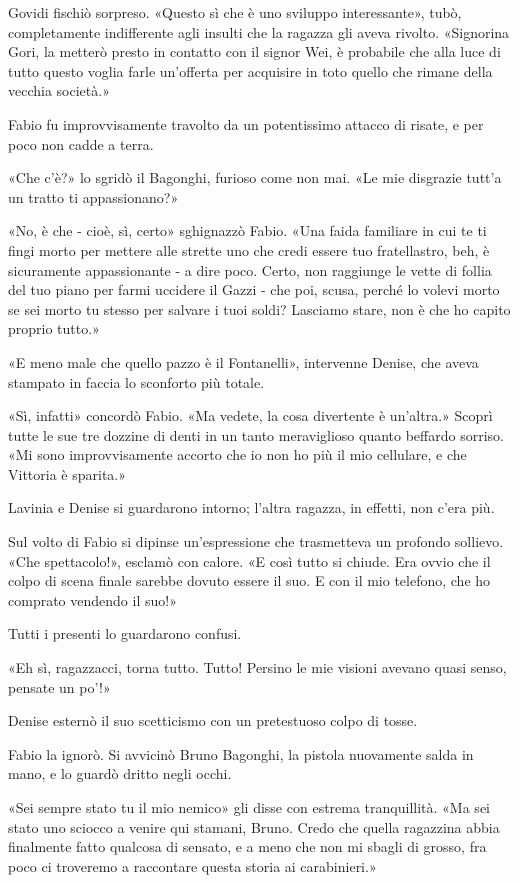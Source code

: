 Govidi fischiò sorpreso. «Questo sì che è uno sviluppo interessante», tubò, completamente indifferente agli insulti che la ragazza gli aveva rivolto. «Signorina Gori, la metterò presto in contatto con il signor Wei, è probabile che alla luce di tutto questo voglia farle un'offerta per acquisire in toto quello che rimane della vecchia società.»

Fabio fu improvvisamente travolto da un potentissimo attacco di risate, e per poco non cadde a terra.

«Che c'è?» lo sgridò il Bagonghi, furioso come non mai. «Le mie disgrazie tutt'a un tratto ti appassionano?»

«No, è che - cioè, sì, certo» sghignazzò Fabio. «Una faida familiare in cui te ti fingi morto per mettere alle strette uno che credi essere tuo fratellastro, beh, è sicuramente appassionante - a dire poco. Certo, non raggiunge le vette di follia del tuo piano per farmi uccidere il Gazzi - che poi, scusa, perché lo volevi morto se sei morto tu stesso per salvare i tuoi soldi? Lasciamo stare, non è che ho capito proprio tutto.»

«E meno male che quello pazzo è il Fontanelli», intervenne Denise, che aveva stampato in faccia lo sconforto più totale.

«Sì, infatti» concordò Fabio. «Ma vedete, la cosa divertente è un'altra.» Scoprì tutte le sue tre dozzine di denti in un tanto meraviglioso quanto beffardo sorriso. «Mi sono improvvisamente accorto che io non ho più il mio cellulare, e che Vittoria è sparita.»

Lavinia e Denise si guardarono intorno; l'altra ragazza, in effetti, non c'era più.

Sul volto di Fabio si dipinse un'espressione che trasmetteva un profondo sollievo. «Che spettacolo!», esclamò con calore. «E così tutto si chiude. Era ovvio che il colpo di scena finale sarebbe dovuto essere il suo. E con il mio telefono, che ho comprato vendendo il suo!»

Tutti i presenti lo guardarono confusi.

«Eh sì, ragazzacci, torna tutto. Tutto! Persino le mie visioni avevano quasi senso, pensate un po'!»

Denise esternò il suo scetticismo con un pretestuoso colpo di tosse.

Fabio la ignorò. Si avvicinò Bruno Bagonghi, la pistola nuovamente salda in mano, e lo guardò dritto negli occhi.

«Sei sempre stato tu il mio nemico» gli disse con estrema tranquillità. «Ma sei stato uno sciocco a venire qui stamani, Bruno. Credo che quella ragazzina abbia finalmente fatto qualcosa di sensato, e a meno che non mi sbagli di grosso, fra poco ci troveremo a raccontare questa storia ai carabinieri.»
